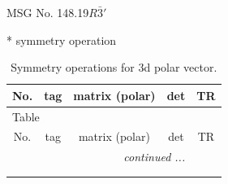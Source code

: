 \documentclass[fleqn,8pt]{jsarticle}
\begin{document}
\setcounter{MaxMatrixCols}{32}

\renewcommand{\tablename}{Table~}
\renewcommand{\figurename}{Figure~}
\begin{center}
\LARGE
MSG No. 148.19\quad$R\bar{3}'$
\end{center}
* symmetry operation
\renewcommand{\arraystretch}{1.3}
\begin{longtable}{ccccc}
\caption{Symmetry operations for 3d polar vector.}
 \\
 \hline \hline
No. & tag & matrix (polar) & det & TR \\ \hline \endfirsthead

\multicolumn{4}{l}{\tablename\ \thetable{}} \\
 \hline \hline
No. & tag & matrix (polar) & det & TR \\ \hline \endhead

 \hline \hline
\multicolumn{4}{r}{\footnotesize\it continued ...} \\ \endfoot

 \hline \hline
\multicolumn{4}{r}{} \\ \endlastfoot


\end{longtable}
\end{document}
